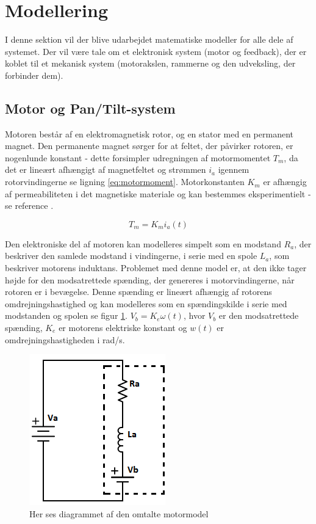 \section{Modellering}
I denne sektion vil der blive udarbejdet matematiske modeller for alle dele af systemet. Der vil være tale om et elektronisk system (motor og feedback), der er koblet til et mekanisk system (motorakslen, rammerne og den udveksling, der forbinder dem). 

\subsection{Motor og Pan/Tilt-system}
Motoren består af en elektromagnetisk rotor, og en stator med en permanent magnet. Den permanente magnet sørger for at feltet, der påvirker rotoren, er nogenlunde konstant - dette forsimpler udregningen af motormomentet $T_{m}$, da det er lineært afhængigt af magnetfeltet og strømmen $i_{a}$ igennem rotorvindingerne se ligning \ref{eq:motormoment}. Motorkonstanten $K_{m}$ er afhængig af permeabiliteten i det magnetiske materiale og kan bestemmes eksperimentielt - se reference \cite{azevedo2013}.

\begin{equation}\label{eq:motormoment}
T_{m}=K_{m}i_{a}(t)
\end{equation}

Den elektroniske del af motoren kan modelleres simpelt som en modstand $R_{a}$, der beskriver den samlede modstand i vindingerne, i serie med en spole $L_{a}$, som beskriver motorens induktans. Problemet med denne model er, at den ikke tager højde for den modsatrettede spænding, der genereres i motorvindingerne, når rotoren er i bevægelse. Denne spænding er lineært afhængig af rotorens omdrejningshastighed og kan modelleres som en spændingskilde i serie med modstanden og spolen se figur \ref{fig:motor_sch}. $V_{b}=K_{e}\omega(t)$, hvor $V_{b}$ er den modsatrettede spænding, $K_{e}$ er motorens elektriske konstant og $w(t)$ er omdrejningshastigheden i rad/s.\\



\begin{figure}
	\begin{center}
		\includegraphics[scale=0.8]{Billeder/Motormodel.png}
	\end{center}
	\caption{Her ses diagrammet af den omtalte motormodel}
	\label{fig:motor_sch}
\end{figure}


